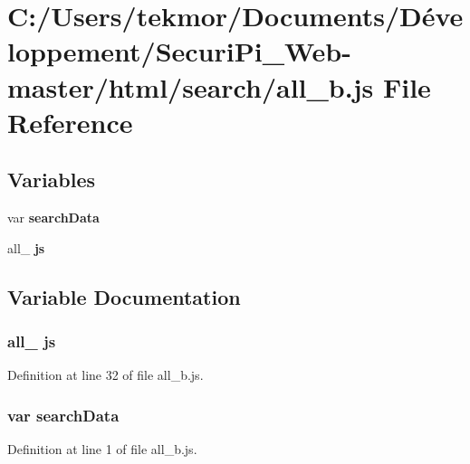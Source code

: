 \section{C\+:/\+Users/tekmor/\+Documents/\+Développement/\+Securi\+Pi\+\_\+\+Web-\/master/html/search/all\+\_\+b.js File Reference}
\label{all__b_8js}
\subsection*{Variables}
\begin{DoxyCompactItemize}
\item 
var {\bf search\+Data}
\item 
all\+\_ {\bf js}
\end{DoxyCompactItemize}


\subsection{Variable Documentation}
\subsubsection[{js}]{\setlength{\rightskip}{0pt plus 5cm}all\+\_ js}\label{all__b_8js_af426b5bf1dcd50d6df175fd408558396}


Definition at line 32 of file all\+\_\+b.\+js.

\subsubsection[{search\+Data}]{\setlength{\rightskip}{0pt plus 5cm}var search\+Data}\label{all__b_8js_ad01a7523f103d6242ef9b0451861231e}


Definition at line 1 of file all\+\_\+b.\+js.

